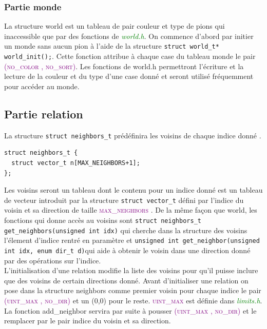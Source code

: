 \documentclass[a4paper]{article}
\begin{document}
\subsubsection{Partie monde}
La structure world est un tableau de pair couleur et type de pions qui inaccessible que par des fonctions de 
\textcolor{green}{\textit{world.h}}. On commence d’abord par initier un monde sans aucun pion à l’aide de la structure 
\lstinline|struct world_t* world_init();|. Cette fonction attribue à chaque case du tableau monde le pair 
\textcolor{purple}{\textsc{(no\_color , no\_sort)}}. Les fonctions de world.h permettront l’écriture et la lecture de la couleur et
 du type d’une case donné et seront utilisé fréquemment pour accéder au monde.  

\subsection{Partie relation}
La structure \lstinline|struct neighbors_t| prédéfinira les voisins de chaque indice donné . 
\begin{lstlisting}
struct neighbors_t {
  struct vector_t n[MAX_NEIGHBORS+1];
};
\end{lstlisting}
Les voisins seront un tableau dont le contenu pour un indice donné est un tableau de vecteur introduit par la structure \lstinline|struct vector_t| défini par l’indice
 du voisin et sa direction de taille \textcolor{purple}{\textsc{max\_neighbors}} . De la même façon que world, les fonctions qui donne 
 accès au voisins sont \lstinline|struct neighbors_t get_neighbors(unsigned int idx)| qui cherche dans la structure des voisins 
 l’élement d’indice rentré en paramètre et \lstinline|unsigned int get_neighbor(unsigned int idx, enum dir_t d)|qui aide à obtenir 
 le voisin dans une direction donné par des opérations sur l’indice.\\ 

L’initialisation d’une relation modifie la liste des voisins pour qu’il puisse inclure que des voisins de certain directions donné. 
Avant d’initialiser une relation on pose dans la structure neighbors comme premier voisin pour chaque indice le pair 
\textcolor{purple}{\textsc{(uint\_max , no\_dir)}} et un (0,0) pour le reste. \textcolor{purple}{\textsc{uint\_max}} est définie 
dans \textcolor{green}{\textit{limits.h}}. La fonction add\_neighbor servira par suite à pousser \textcolor{purple}{\textsc{(uint\_max , no\_dir)}} 
et le remplacer par le pair indice du voisin et sa direction.
\end{document}
